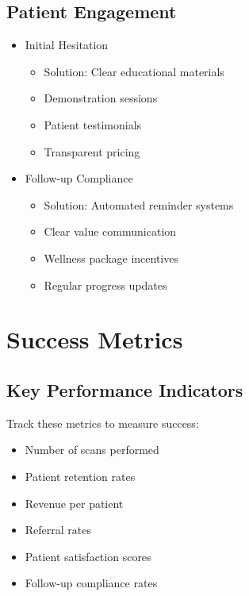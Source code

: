 \documentclass[
  Letterpaper,
]{scrbook}
\providecommand{\tightlist}{%
  \setlength{\itemsep}{0pt}\setlength{\parskip}{0pt}}\usepackage{longtable,booktabs,array}
\begin{document}
\subsection{Patient Engagement}\label{patient-engagement}

\begin{itemize}
\tightlist
\item
  Initial Hesitation

  \begin{itemize}
  \tightlist
  \item
    Solution: Clear educational materials
  \item
    Demonstration sessions
  \item
    Patient testimonials
  \item
    Transparent pricing
  \end{itemize}
\item
  Follow-up Compliance

  \begin{itemize}
  \tightlist
  \item
    Solution: Automated reminder systems
  \item
    Clear value communication
  \item
    Wellness package incentives
  \item
    Regular progress updates
  \end{itemize}
\end{itemize}

\section{Success Metrics}\label{success-metrics}

\subsection{Key Performance
Indicators}\label{key-performance-indicators}

Track these metrics to measure success:

\begin{itemize}
\tightlist
\item
  Number of scans performed
\item
  Patient retention rates
\item
  Revenue per patient
\item
  Referral rates
\item
  Patient satisfaction scores
\item
  Follow-up compliance rates
\end{itemize}
\end{document}
